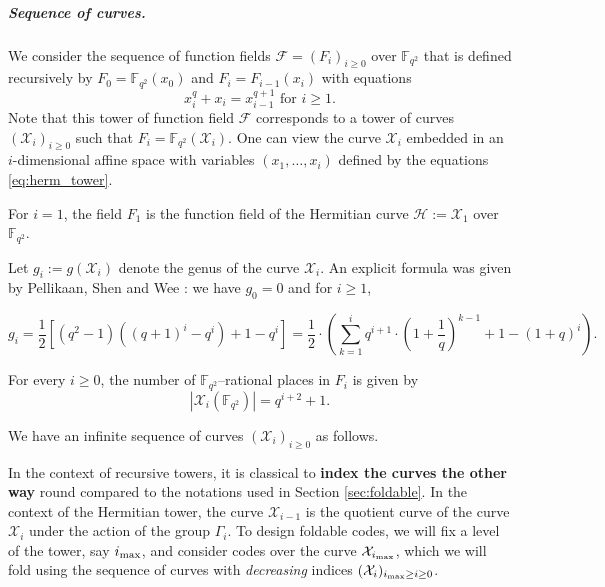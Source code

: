 \documentclass[a4paper,USenglish,autoref]{lipics-v2021}
\newcommand\F{\mathbb{F}}
\newcommand\PP{\mathbb{P}}
\newcommand{\size}[1]{\left|#1\right|}
\newcommand\calX{\mathcal{X}}
\newcommand\calF{\mathcal{F}}
\newcommand{\cd}{\cdot}
\newcommand{\ii}{i_{\rm{max}}}
\begin{document}
\subparagraph*{Sequence of curves.}
We consider the sequence of function fields $\calF=(F_i)_{i\geq 0}$ over $\F_{q^2}$ that is defined recursively by $F_0=\F_{q^2}(x_0)$ and $F_i = F_{i-1}(x_i)$ with equations
\begin{equation}\label{eq:herm_tower}
	x_i^q+x_{i} = x_{i-1}^{q+1} \text{ for } i\geq 1.
\end{equation}
Note that this tower of function field $\mathcal{F}$ corresponds to a tower of curves
$(\calX_i)_{i\geq 0}$ such that $F_i=\F_{q^2}(\calX_i)$. One can view the curve $\calX_i$ embedded in an $i$-dimensional affine space with variables $(x_1,\dots,x_i)$ defined by the equations \eqref{eq:herm_tower}.

For $i=1$, the field $F_1$ is the function field of the Hermitian curve $\mathcal{H}:= \calX_1$ over $\F_{q^2}$.

Let $g_i:=g(\calX_i)$ denote the genus of the curve $\calX_i$. An explicit formula was given by Pellikaan, Shen and Wee \cite[Proposition 4]{PSW91}: we have $g_0=0$ and for $i\geq 1$, 

\begin{equation}\label{eq:genus_herm}
	g_i = \frac{1}{2}\left[(q^2-1)\left((q+1)^i-q^i\right) +1 -q^i\right]
	=\dfrac{1}{2} \cd \left(\sum\limits_{k=1}^i q^{i+1} \cd \left(1+\frac{1}{q}\right)^{k-1} +1 -(1+q)^i\right).
\end{equation}

For every $i \geq 0$, the number of $\F_{q^2}$--rational places in $F_i$ is given by
\[\size{\calX_i(\F_{q^2})} = q^{i+2}+1.\]

We have an infinite sequence of curves $(\calX_i)_{i\ge 0}$ as follows.

\begin{center}
\end{center} 

\begin{remark}
	In the context of recursive towers, it is classical to \textbf{index the curves the other way} round compared to the notations used in Section \ref{sec:foldable}. In the context of the Hermitian tower, the curve $\calX_{i-1}$ is the quotient curve of the curve $\calX_i$ under the action of the group $\Gamma_i$. To design foldable codes, we will fix a level of the tower, say $\ii$, and consider codes over the curve $\calX_{\ii}$, which we will fold using the sequence of curves with \emph{decreasing} indices $(\calX_i)_{\ii \geq i \geq 0}$.
\end{remark}
\end{document}
